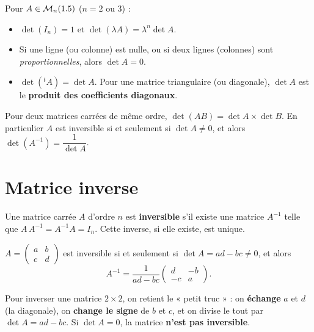 \begin{propriete}
Pour $A\in\mathcal M_n(1.5)$ ($n=2$ ou $3$) :
\begin{itemize}
\item $\det(I_n)=1$ et $\det(\lambda A)=\lambda^{n}\det A$.
\item Si une ligne (ou colonne) est nulle, ou si deux lignes (colonnes) sont
\emph{proportionnelles}, alors $\det A=0$.
\item $\det({}^{t}\!A)=\det A$. Pour une matrice triangulaire (ou diagonale), $\det A$ est le
\textbf{produit des coefficients diagonaux}.
\end{itemize}
\end{propriete}

\begin{theoreme}
Pour deux matrices carrées de même ordre, $\det(AB)=\det A\times\det B$. En particulier
$A$ est inversible si et seulement si $\det A\neq0$, et alors $\det(A^{-1})=\dfrac1{\det A}$.
\end{theoreme}

\section{Matrice inverse}

\begin{definition}
Une matrice carrée $A$ d'ordre $n$ est \textbf{inversible} s'il existe une matrice $A^{-1}$
telle que $A\,A^{-1}=A^{-1}A=I_n$. Cette inverse, si elle existe, est unique.
\end{definition}

\begin{propriete}
$A=\begin{pmatrix}a&b\\c&d\end{pmatrix}$ est inversible si et seulement si $\det A=ad-bc\neq0$,
et alors
\[
A^{-1}=\frac1{ad-bc}\begin{pmatrix}d&-b\\-c&a\end{pmatrix}.
\]
\end{propriete}

\begin{aretenir}
Pour inverser une matrice $2\times2$, on retient le « petit truc » : on \textbf{échange} $a$ et
$d$ (la diagonale), on \textbf{change le signe} de $b$ et $c$, et on divise le tout par
$\det A=ad-bc$. Si $\det A=0$, la matrice \textbf{n'est pas inversible}.
\end{aretenir}

